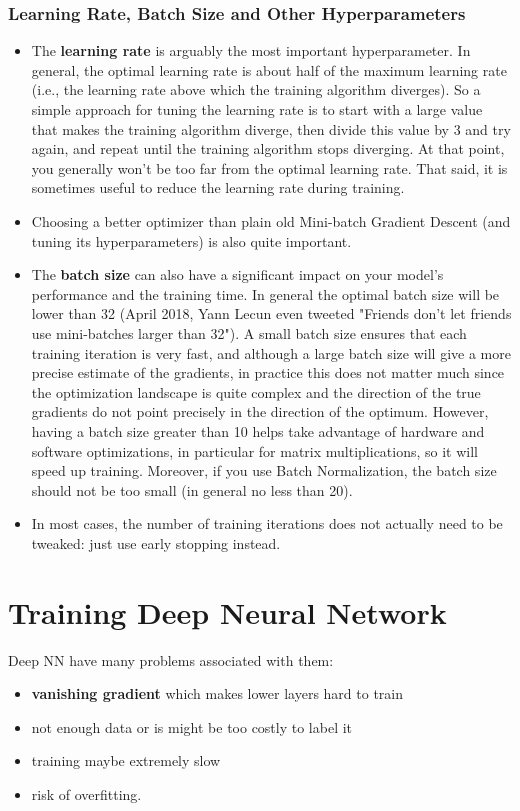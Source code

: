 \documentclass[12pt, letterpaper]{article}
\theoremstyle{definition}
\let\tb\textbf
\begin{document}
\subsubsection{Learning Rate, Batch Size and Other Hyperparameters}
\begin{itemize}
\item The \tb{learning rate} is arguably the most important hyperparameter. In general, the optimal learning rate is about half of the maximum learning rate (i.e., the learning rate above which the training algorithm diverges). So a simple approach for tuning the learning rate is to start with a large value that makes the training algorithm diverge, then divide this value by $3$ and try again, and repeat until the training algorithm stops diverging. At that point, you generally won't be too far from the optimal learning rate. That said, it is sometimes useful to reduce the learning rate during training.

\item Choosing a better optimizer than plain old Mini-batch Gradient Descent (and tuning its hyperparameters) is also quite important.
\item The \tb{batch size} can also have a significant impact on your model's performance and the training time. In general the optimal batch size will be lower than 32 (April 2018, Yann Lecun even tweeted "Friends don't let friends use mini-batches larger than 32"). A small batch size ensures that each training iteration is very fast, and although a large batch size will give a more precise estimate of the gradients, in practice this does not matter much since the optimization landscape is quite complex and the direction of the true gradients do not point precisely in the direction of the optimum. However, having a batch size greater than 10 helps take advantage of hardware and software optimizations, in particular for matrix multiplications, so it will speed up training. Moreover, if you use Batch Normalization, the batch size should not be too small (in general no less than 20).
\item In most cases, the number of training iterations does not actually need to be tweaked: just use early stopping instead.
\end{itemize}

\newpage
\section{Training Deep Neural Network}
Deep NN have many problems associated with them:
\begin{itemize}
\item \tb{vanishing gradient} which makes lower layers hard to train
\item not enough data or is might be too costly to label it
\item training maybe extremely slow
\item risk of overfitting.
\end{itemize}
\end{document}
